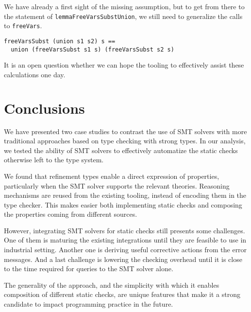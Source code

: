 \documentclass[sigconf, anonymous, review]{acmart}
\newcommand{\tc}[1]{{\small\texttt{#1}}}
\begin{document}
We have already a first sight of the missing assumption, but to get from
there to the statement of \tc{lemmaFreeVarsSubstUnion}, we still need
to generalize the calls to \tc{freeVars}.

\begin{verbatim}
freeVarsSubst (union s1 s2) s ==
  union (freeVarsSubst s1 s) (freeVarsSubst s2 s)
\end{verbatim}

It is an open question whether we can hope the tooling to effectively
assist these calculations one day.


\section{Conclusions}
\label{conclusions}

We have presented two case studies to contrast the use of SMT solvers
with more traditional approaches based on type checking with strong types. In
our analysis, we tested the ability of SMT solvers to effectively automatize
the static checks otherwise left to the type system.

We found that refinement types enable a direct expression of properties,
particularly when the SMT solver supports the relevant theories. Reasoning
mechanisms are reused from the existing tooling, instead of encoding them
in the type checker. This makes easier both implementing static checks and
composing the properties coming from different sources.

However, integrating SMT solvers for static checks still presents some
challenges. One of them is maturing the existing integrations until they are
feasible to use in industrial setting. Another one is deriving useful
corrective actions from the error messages. And a last challenge is lowering
the checking overhead until it is close to the time required for queries to
the SMT solver alone.

The generality of the approach, and the simplicity with which it enables
composition of different static checks, are unique features that make it a strong
candidate to impact programming practice in the future.



\end{document}
